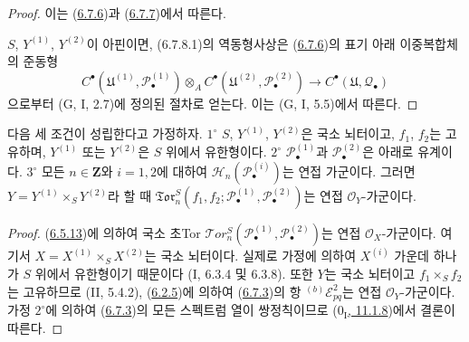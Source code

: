 \begin{proof}
이는 (\hyperref[III.6.7.6-fr]{6.7.6})과
(\hyperref[III.6.7.7-fr]{6.7.7})에서 따른다.

$S$, $Y^{(1)}$, $Y^{(2)}$이 아핀이면, (6.7.8.1)의 역동형사상은
(\hyperref[III.6.7.6-fr]{6.7.6})의 표기 아래 이중복합체의 준동형
\[
  C^\bullet(\mathfrak U^{(1)},\mathscr P_\bullet^{(1)})
  \otimes_A
  C^\bullet(\mathfrak U^{(2)},\mathscr P_\bullet^{(2)})
  \longrightarrow
  C^\bullet(\mathfrak U,\mathscr Q_\bullet)
\]
으로부터 (G, I, 2.7)에 정의된 절차로 얻는다. 이는 (G, I, 5.5)에서
따른다.
\end{proof}

\begin{proposition}[6.7.9]
\label{III.6.7.9-fr}
다음 세 조건이 성립한다고 가정하자.
$1^\circ$ $S$, $Y^{(1)}$, $Y^{(2)}$은 국소 뇌터이고,
$f_1$, $f_2$는 고유하며, $Y^{(1)}$ 또는 $Y^{(2)}$은 $S$ 위에서
유한형이다.
$2^\circ$ $\mathscr P_\bullet^{(1)}$과
$\mathscr P_\bullet^{(2)}$은 아래로 유계이다.
$3^\circ$ 모든 $n\in\mathbf Z$와 $i=1,2$에 대하여
$\mathscr H_n(\mathscr P_\bullet^{(i)})$는 연접 가군이다.
그러면 $Y=Y^{(1)}\times_S Y^{(2)}$라 할 때
$\mathfrak{Tor}_n^S
(f_1,f_2;\mathscr P_\bullet^{(1)},\mathscr P_\bullet^{(2)})$는
연접 $\mathscr O_Y$-가군이다.
\end{proposition}

\begin{proof}
(\hyperref[III.6.5.13-fr]{6.5.13})에 의하여 국소 초Tor
$\mathscr{T}\!or_n^S(\mathscr P_\bullet^{(1)},\mathscr P_\bullet^{(2)})$는
연접 $\mathscr O_X$-가군이다. 여기서
$X=X^{(1)}\times_S X^{(2)}$는 국소 뇌터이다. 실제로 가정에 의하여
$X^{(i)}$ 가운데 하나가 $S$ 위에서 유한형이기 때문이다
(I, 6.3.4 및 6.3.8). 또한 $Y$는 국소 뇌터이고
$f_1\times_S f_2$는 고유하므로 (II, 5.4.2),
(\hyperref[III.6.2.5-fr]{6.2.5})에 의하여
(\hyperref[III.6.7.3-fr]{6.7.3})의 항
${}^{(b)}\mathscr E_{pq}^2$는 연접 $\mathscr O_Y$-가군이다.
가정 $2^\circ$에 의하여
(\hyperref[III.6.7.3-fr]{6.7.3})의 모든 스펙트럼 열이 쌍정칙이므로
(\hyperref[0.11.1.8-fr]{$0_{\mathrm I}$, 11.1.8})에서 결론이 따른다.
\end{proof}


